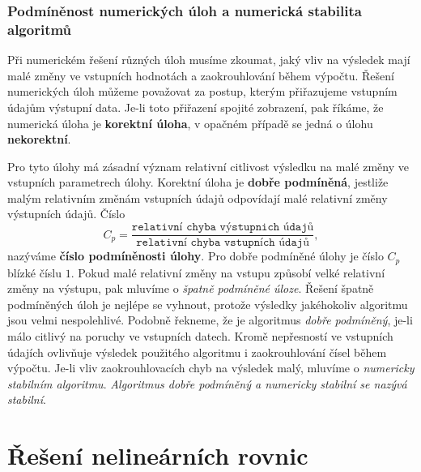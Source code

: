 {      \subsubsection{Podmíněnost numerických úloh a numerická stabilita algoritmů}
        Při numerickém řešení různých úloh musíme zkoumat, jaký vliv na výsledek mají malé změny ve
        vstupních hodnotách a zaokrouhlování během výpočtu. Řešení numerických úloh můžeme považovat
        za postup, kterým přiřazujeme vstupním údajům výstupní data. Je-li toto přiřazení spojité
        zobrazení, pak říkáme, že numerická úloha je \textbf{korektní úloha}, v opačném případě se
        jedná o úlohu \textbf{nekorektní}.
  
        Pro tyto úlohy má zásadní význam relativní citlivost výsledku na malé změny ve vstupních
        parametrech úlohy. Korektní úloha je \textbf{dobře pod\-mí\-ně\-ná}, jestliže malým
        relativním změnám vstupních údajů odpovídají malé relativní změny výstupních údajů. Číslo
        \begin{equation}\label{nm:eq_podminenost}
          C_p=\frac{\texttt{relativní chyba výstupnich údajů}}{\texttt{relativní chyba vstupních
              údajů}},
        \end{equation}
        nazýváme \textbf{číslo podmíněnosti úlohy}. Pro dobře podmíněné úlohy je číslo $C_p$ blízké
        číslu $1$. Pokud malé relativní změny na vstupu způsobí velké relativní změny na výstupu, 
        pak  mluvíme o \emph{špatně podmíněné úloze}. Řešení špatně podmíněných úloh je nejlépe se
        vyhnout, protože výsledky jakéhokoliv algoritmu jsou velmi nespolehlivé. Podobně řekneme, že
        je algoritmus \emph{dobře pod\-mí\-ně\-ný}, je-li málo citlivý na poruchy ve vstupních
        datech. Kromě ne\-přes\-ností ve vstupních údajích ovlivňuje výsledek použitého algoritmu i
        zaokrouhlování čísel během výpočtu. Je-li vliv zaokrouhlovacích chyb na výsledek malý,
        mluvíme o \emph{numericky stabilním algoritmu}. \emph{Algoritmus dobře pod\-mí\-ně\-ný a
        numericky stabilní se nazývá stabilní}.
  
  \section{Řešení nelineárních rovnic}
}
